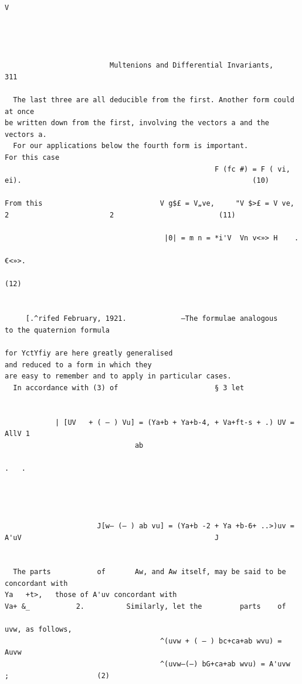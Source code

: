 \documentclass[10pt]{article}
\begin{document}
\begin{verbatim}

                                                                                                 V




                         Multenions and Differential Invariants,                                                                311

  The last three are all deducible from the first. Another form could at once
be written down from the first, involving the vectors a and the vectors a.
  For our applications below the fourth form is important.                                                        For this case
                                                  F (fc #) = F ( vi, ei).                                                       (10)

From this                            V g$£ = V„ve,     "V $>£ = V ve,        2                        2                         (11)

                                      |0| = m n = *i'V  Vn v<»> H    .
                                                                                                     €<»>.
                                                                                                                                (12)


     [.^rifed February, 1921.             —The formulae analogous                                    to the quaternion formula

for YctYfiy are here greatly generalised                             and reduced to a form in which they
are easy to remember and to apply in particular cases.
  In accordance with (3) of                       § 3 let


            | [UV   + ( — ) Vu] = (Ya+b + Ya+b-4, + Va+ft-s + .) UV = AllV 1
                               ab
                                                                                                      .   .




                      J[w— (— ) ab vu] = (Ya+b -2 + Ya +b-6+ ..>)uv = A'uV                                              J


  The parts           of       Aw, and Aw itself, may be said to be concordant with
Ya   +t>,   those of A'uv concordant with                           Va+ &_           2.          Similarly, let the         parts    of

uvw, as follows,
                                     ^(uvw + ( — ) bc+ca+ab wvu) = Auvw
                                     ^(uvw—(—) bG+ca+ab wvu) = A'uvw                                          ;                     (2)



\end{verbatim}
\end{document}
